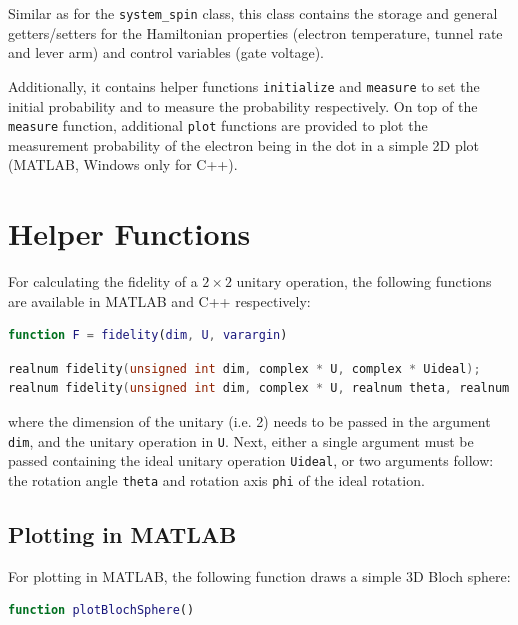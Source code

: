 \documentclass[10pt,a4paper,onecolumn,notitlepage]{article}
\begin{document}
Similar as for the \lstinline{system_spin} class, this class contains the storage and general getters/setters for the Hamiltonian properties (electron temperature, tunnel rate and lever arm) and control variables (gate voltage).

Additionally, it contains helper functions \lstinline{initialize} and \lstinline{measure} to set the initial probability and to measure the probability respectively. On top of the \lstinline{measure} function, additional \lstinline{plot} functions are provided to plot the measurement probability of the electron being in the dot in a simple 2D plot (MATLAB, Windows only for C++).

\section{Helper Functions}
\label{sec:helper}
For calculating the fidelity of a $2\times2$ unitary operation, the following functions are available in MATLAB and C++ respectively:
\begin{lstlisting}[language=MATLAB]
function F = fidelity(dim, U, varargin)
\end{lstlisting}
\begin{lstlisting}[language=C++]
realnum fidelity(unsigned int dim, complex * U, complex * Uideal);
realnum fidelity(unsigned int dim, complex * U, realnum theta, realnum phi);
\end{lstlisting}
where the dimension of the unitary (i.e. 2) needs to be passed in the argument \lstinline{dim}, and the unitary operation in \lstinline{U}. Next, either a single argument must be passed containing the ideal unitary operation \lstinline{Uideal}, or two arguments follow: the rotation angle \lstinline{theta} and rotation axis \lstinline{phi} of the ideal rotation.

\subsection{Plotting in MATLAB}
\label{sec:plot_matlab}
For plotting in MATLAB, the following function draws a simple 3D Bloch sphere:
\begin{lstlisting}[language=MATLAB]
function plotBlochSphere()
\end{lstlisting}
\end{document}

